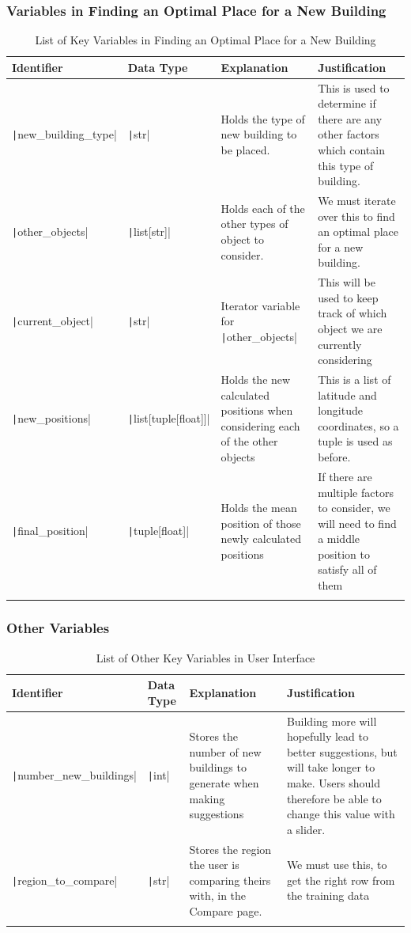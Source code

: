 \documentclass[12pt]{report}
\newcommand{\pil}[1]{\protect\texttt|#1|}
\begin{document}
\subsubsection{Variables in Finding an Optimal Place for a New Building}
\begin{center}
\begin{longtable}{ | m{3cm} | m{4cm}| m{4cm} | m{4cm} |} 
    \hline
    \textbf{Identifier} & \textbf{Data Type} & \textbf{Explanation}  & \textbf{Justification} \\ 
    \hline
    \pil{new_building_type} & \pil{str} & Holds the type of new building to be placed. & This is used to determine if there are any other factors which contain this type of building. \\ 
    \hline
    \pil{other_objects} & \pil{list[str]} & Holds each of the other types of object to consider. & We must iterate over this to find an optimal place for a new building. \\ 
    \hline
    \pil{current_object} & \pil{str} & Iterator variable for \pil{other_objects} & This will be used to keep track of which object we are currently considering \\ 
    \hline
    \pil{new_positions} & \pil{list[tuple[float]]} & Holds the new calculated positions when considering each of the other objects & This is a list of latitude and longitude coordinates, so a tuple is used as before. \\ 
    \hline
    \pil{final_position} & \pil{tuple[float]} & Holds the mean position of those newly calculated positions & If there are multiple factors to consider, we will need to find a middle position to satisfy all of them \\ 
    \hline
\caption{List of Key Variables in Finding an Optimal Place for a New Building}
\end{longtable}
\end{center}

\subsubsection{Other Variables}
\begin{center}
\begin{longtable}{ | m{3cm} | m{4cm}| m{4cm} | m{4cm} |} 
    \hline
    \textbf{Identifier} & \textbf{Data Type} & \textbf{Explanation}  & \textbf{Justification} \\ 
    \hline
    \pil{number_new_buildings} & \pil{int} & Stores the number of new buildings to generate when making suggestions & Building more will hopefully lead to better suggestions, but will take longer to make. Users should therefore be able to change this value with a slider. \\ 
    \hline
    \pil{region_to_compare} & \pil{str} & Stores the region the user is comparing theirs with, in the Compare page. & We must use this, to get the right row from the training data \\ 
    \hline
\caption{List of Other Key Variables in User Interface}
\end{longtable}
\end{center}
\end{document}
